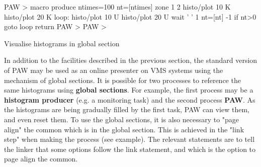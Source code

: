 \begin{minipage}{.48\textwidth}
\end{minipage}\hfill
\begin{minipage}{.50\textwidth}
\begin{XMP}
    PAW > 
       macro produce ntimes=100
         nt=[ntimes]
         zone 1 2
         histo/plot 10 K
         histo/plot 20 K
       loop:
           histo/plot 10 U
           histo/plot 20 U
           wait ' ' 1
           nt=[nt] -1
           if nt>0 goto loop
       return
    PAW > 
    PAW > 
\end{XMP}
\begin{Fighere}
\caption{Visualise histograms in global section}
\end{Fighere}
\end{minipage}
 
In addition to the facilities described in the previous section,
the standard version of PAW may be used as an online presenter
on VMS systems using the mechanism of global sections.
It is possible for two processes to reference the same histograms
using {\bf global sections}.
For example, the first process may be a {\bf histogram producer}
(e.g. a monitoring task) and the second process  {\bf PAW}.
As the
histograms are being gradually filled by the first task, PAW can
view them, and even reset them.
To use the global sections, it is also necessary to "page align" the common
which is in the global section. This is achieved in the "link step" when making
the process (see example).
The relevant statements are 
to tell the linker that some options follow the link statement,
and  which is the option to
page align the  common.
 
